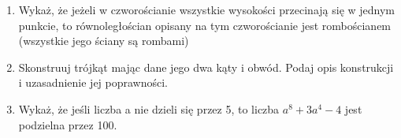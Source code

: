\documentclass[10pt]{article}
\begin{document}
\begin{enumerate}
  \item Wykaż, że jeżeli w czworościanie wszystkie wysokości przecinają się w jednym punkcie, to równoległościan opisany na tym czworościanie jest rombościanem (wszystkie jego ściany są rombami)
  \item Skonstruuj trójkąt mając dane jego dwa kąty i obwód. Podaj opis konstrukcji i uzasadnienie jej poprawności.
  \item Wykaż, że jeśli liczba a nie dzieli się przez 5, to liczba \(a^{8}+3 a^{4}-4\) jest podzielna przez 100.
\end{enumerate}
\end{document}
